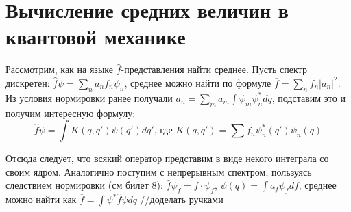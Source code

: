 \newpage
\chapter{Вычисление средних величин в квантовой механике}
\par Рассмотрим, как на языке $\hat{f}$-представления найти среднее. Пусть спектр дискретен: $\hat{f}\psi = \sum_{n} a_n f_n  \psi_n$, среднее можно найти по формуле $ \overline{f}=\sum_{n}f_n |a_n|^2$. Из условия нормировки ранее получали  $a_n = \sum_{m}a_m \int \psi_m \psi_n^* dq$, подставим это и получим интересную формулу:
$$ \hat{f} \psi = \int K(q{,}q\prime) \psi (q\prime) dq\prime \text{, где } K(q{,}q\prime)=\sum f_n \psi_n^* (q\prime) \psi_n (q)  $$
\par Отсюда следует, что всякий оператор представим в виде некого интеграла со своим ядром. Аналогично поступим с непрерывным спектром, пользуясь следствием нормировки (см билет 8): 
$\hat{f}\psi_f = f \cdot \psi_f $, $\psi (q)= \int a_f \psi_f df$, среднее можно найти как  $\overline{f} = \int \psi^* \hat{f} \psi dq$ //доделать ручками
